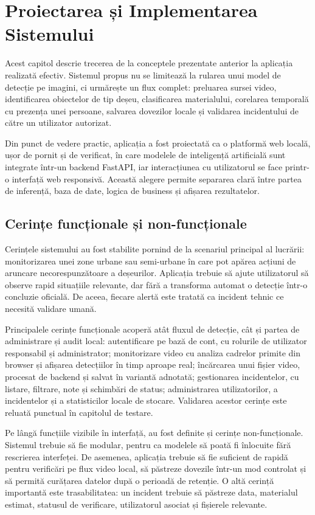 \chapter{Proiectarea și Implementarea Sistemului}

Acest capitol descrie trecerea de la conceptele prezentate anterior la aplicația realizată efectiv. Sistemul propus nu se limitează la rularea unui model de detecție pe imagini, ci urmărește un flux complet: preluarea sursei video, identificarea obiectelor de tip deșeu, clasificarea materialului, corelarea temporală cu prezența unei persoane, salvarea dovezilor locale și validarea incidentului de către un utilizator autorizat.

Din punct de vedere practic, aplicația a fost proiectată ca o platformă web locală, ușor de pornit și de verificat, în care modelele de inteligență artificială sunt integrate într-un backend FastAPI, iar interacțiunea cu utilizatorul se face printr-o interfață web responsivă. Această alegere permite separarea clară între partea de inferență, baza de date, logica de business și afișarea rezultatelor.

\section{Cerințe funcționale și non-funcționale}

Cerințele sistemului au fost stabilite pornind de la scenariul principal al lucrării: monitorizarea unei zone urbane sau semi-urbane în care pot apărea acțiuni de aruncare necorespunzătoare a deșeurilor. Aplicația trebuie să ajute utilizatorul să observe rapid situațiile relevante, dar fără a transforma automat o detecție într-o concluzie oficială. De aceea, fiecare alertă este tratată ca incident tehnic ce necesită validare umană.

Principalele cerințe funcționale acoperă atât fluxul de detecție, cât și partea de administrare și audit local: autentificare pe bază de cont, cu rolurile de utilizator responsabil și administrator; monitorizare video cu analiza cadrelor primite din browser și afișarea detecțiilor în timp aproape real; încărcarea unui fișier video, procesat de backend și salvat în variantă adnotată; gestionarea incidentelor, cu listare, filtrare, note și schimbări de status; administrarea utilizatorilor, a incidentelor și a statisticilor locale de stocare. Validarea acestor cerințe este reluată punctual în capitolul de testare.

Pe lângă funcțiile vizibile în interfață, au fost definite și cerințe non-funcționale. Sistemul trebuie să fie modular, pentru ca modelele să poată fi înlocuite fără rescrierea interfeței. De asemenea, aplicația trebuie să fie suficient de rapidă pentru verificări pe flux video local, să păstreze dovezile într-un mod controlat și să permită curățarea datelor după o perioadă de retenție. O altă cerință importantă este trasabilitatea: un incident trebuie să păstreze data, materialul estimat, statusul de verificare, utilizatorul asociat și fișierele relevante.

